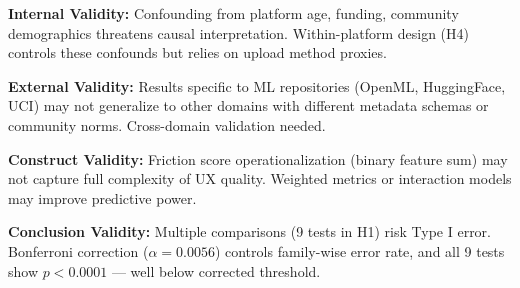 \textbf{Internal Validity:} Confounding from platform age, funding, community demographics threatens causal interpretation. Within-platform design (H4) controls these confounds but relies on upload method proxies.

\textbf{External Validity:} Results specific to ML repositories (OpenML, HuggingFace, UCI) may not generalize to other domains with different metadata schemas or community norms. Cross-domain validation needed.

\textbf{Construct Validity:} Friction score operationalization (binary feature sum) may not capture full complexity of UX quality. Weighted metrics or interaction models may improve predictive power.

\textbf{Conclusion Validity:} Multiple comparisons (9 tests in H1) risk Type I error. Bonferroni correction ($\alpha=0.0056$) controls family-wise error rate, and all 9 tests show $p<0.0001$ --- well below corrected threshold.
